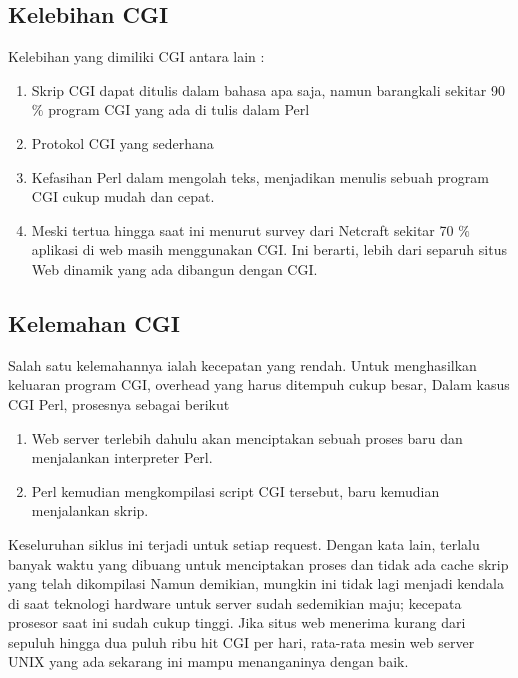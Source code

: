 \subsection{Kelebihan CGI} 
Kelebihan yang dimiliki CGI antara lain :
\begin{enumerate}
	\item Skrip CGI dapat ditulis dalam bahasa apa saja, namun barangkali sekitar 90 $  \%  $ program CGI yang ada di tulis dalam Perl 
	\item Protokol CGI yang sederhana
	\item Kefasihan Perl dalam mengolah teks, menjadikan menulis sebuah program CGI cukup mudah dan cepat.
	\item Meski tertua hingga saat ini menurut survey dari Netcraft sekitar 70 $  \%  $ aplikasi di web masih menggunakan CGI. Ini berarti, lebih dari separuh situs Web dinamik yang ada dibangun dengan CGI.
\end{enumerate}

\subsection{Kelemahan CGI} 
Salah satu kelemahannya ialah kecepatan yang rendah. Untuk menghasilkan keluaran program CGI, overhead yang harus ditempuh cukup besar, Dalam kasus CGI Perl, prosesnya sebagai berikut 
\begin{enumerate}
	\item Web server terlebih dahulu akan menciptakan sebuah proses baru dan menjalankan interpreter Perl.
	\item Perl kemudian mengkompilasi script CGI tersebut, baru kemudian menjalankan skrip.
\end{enumerate}
Keseluruhan siklus ini terjadi untuk setiap request. Dengan kata lain, terlalu banyak waktu yang dibuang untuk menciptakan proses dan tidak ada cache skrip yang telah dikompilasi
Namun demikian, mungkin ini tidak lagi menjadi kendala di saat teknologi hardware untuk server sudah sedemikian maju; kecepata prosesor saat ini sudah cukup tinggi. Jika situs web menerima kurang dari sepuluh hingga dua puluh ribu hit CGI per hari, rata-rata mesin web server UNIX yang ada sekarang ini mampu menanganinya dengan baik. 

